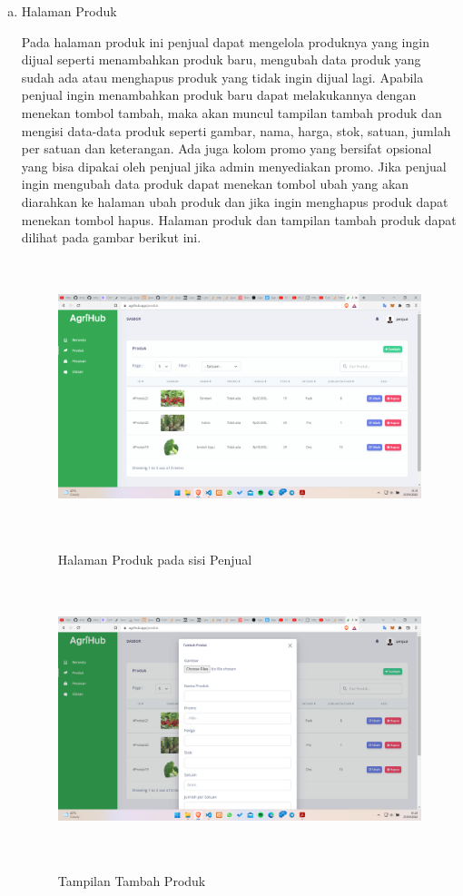 \begin{enumerate}
\begin{enumerate}[a.]
		\item Halaman Produk
		\par Pada halaman produk ini penjual dapat mengelola produknya yang ingin dijual seperti menambahkan produk baru, mengubah data produk yang sudah ada atau menghapus produk yang tidak ingin dijual lagi. Apabila penjual ingin menambahkan produk baru dapat melakukannya dengan menekan tombol tambah, maka akan muncul tampilan tambah produk dan mengisi data-data produk seperti gambar, nama, harga, stok, satuan, jumlah per satuan dan keterangan. Ada juga kolom promo yang bersifat opsional yang bisa dipakai oleh penjual jika admin menyediakan promo. Jika penjual ingin mengubah data produk dapat menekan tombol ubah yang akan diarahkan ke halaman ubah produk dan jika ingin menghapus produk dapat menekan tombol hapus. Halaman produk dan tampilan tambah produk dapat dilihat pada gambar berikut ini.
		\begin{figure}[H]
			\centering
			{\includegraphics [width = 13.3cm, height= 8cm]{gambar/penjual/produk_penjual}}
			\caption{Halaman Produk pada sisi Penjual}
			\label{produk_penjual}
		\end{figure}
		\begin{figure}[H]
			\centering
			{\includegraphics [width = 13.3cm, height= 8cm]{gambar/penjual/tambah_produk}}
			\caption{Tampilan Tambah Produk}
			\label{tambah_produk}
		\end{figure}


\end{enumerate}
\end{enumerate}
